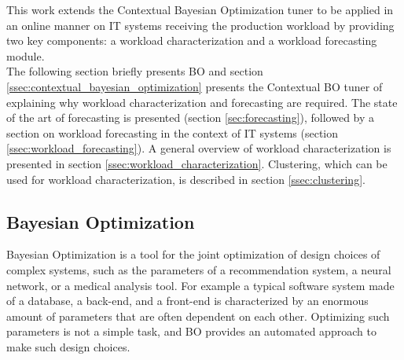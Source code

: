 \documentclass[a4paper, 12pt]{article} %
\begin{document}
	This work extends the Contextual Bayesian Optimization tuner \cite{AkamasCGP} to be applied in an online manner	on IT systems receiving the production workload by providing two key components: a workload characterization and a workload forecasting module. \\
	The following section briefly presents BO and section \ref{ssec:contextual_bayesian_optimization} presents the Contextual BO tuner of \cite{AkamasCGP} explaining why workload characterization and forecasting are required. The state of the art of forecasting is presented (section \ref{sec:forecasting}), followed by a section on workload forecasting in the context of IT systems (section \ref{ssec:workload_forecasting}). A general overview of workload characterization is presented in section \ref{ssec:workload_characterization}. Clustering, which can be used for workload characterization, is described in section \ref{ssec:clustering}.
	
	\subsection{Bayesian Optimization } \label{ssec:bayesian_optimization}
	Bayesian Optimization \cite{BO} is a tool for the joint optimization of design choices of complex systems, such as the parameters of a recommendation system, a neural network, or a medical analysis tool. For example a typical software system made of a database, a back-end, and a front-end is characterized by an enormous amount of parameters that are often dependent on each other.
	Optimizing such parameters is not a simple task, and BO provides an automated approach to make such design choices.\\
	
\end{document}
